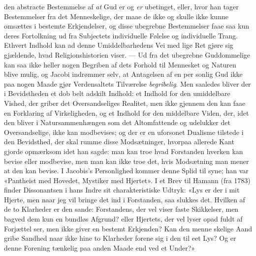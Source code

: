 \documentclass[12pt,a4paper]{book}
\begin{document}
den abstracte Bestemmelse af \emph{at} Gud er og \emph{er} ubetinget, eller,
hvor han tager Bestemmelser fra det Menneskelige, der maae
de ikke og skulle ikke kunne omsættes i bestemte Erkjendelser,
og disse ubegrebne Bestemmelser faae saa kun deres Fortolkning
ud fra Subjectets individuelle Følelse og individuelle Trang.
Ethvert Indhold kan ad denne Umiddelbarhedens Vei med lige
Ret gjøre sig gjældende, hvad Religionshistorien viser. --- Ud
fra det ubegrebne Guddommelige kan saa ikke heller nogen
Begriben af dets Forhold til Mennesket og Naturen blive
mulig, og Jacobi indrømmer selv, at Antagelsen af en per\-%
sonlig Gud ikke paa nogen Maade gjør Verdensaltets Tilværelse
\emph{begribelig}. Men saaledes bliver der i Bevidstheden et dob\-%
belt adskilt Indhold: et Indhold for den umiddelbare Vished,
der griber det Oversandseliges Realitet, men ikke gjennem den
kan faae en Forklaring af Virkeligheden, og et Indhold for den
middelbare Viden, der, idet den bliver i Natursammenhængen
som det Altomfattende og udelukker det Oversandselige, ikke
kan modbevises; og der er en uforsonet Dualisme tilstede i
den Bevidsthed, der skal rumme disse Modsætninger, hvorpaa
allerede Kant gjorde opmærksom idet han sagde: man kan
troe hvad Forstanden hverken kan bevise eller modbevise, men
man kan ikke troe det, hvis Modsætning man mener at den
kan bevise. I Jacobis's Personlighed kommer denne Splid til\-%
syne; han var «Pantheist med Hovedet, Mystiker med Hjertet».
I et Brev til Hamann (fra 1783) finder Dissonantsen i hans
Indre sit charakteristiske Udtryk: «Lys er der i mit Hjerte,
men naar jeg vil bringe det ind i Forstanden, saa slukkes det.
Hvilken af de to Klarheder er den sande: Forstandens, der
vel viser faste Skikkelser, men bagved dem kun en bundløs
Afgrund? eller Hjertets, der vel lyser opad fuldt af Forjættel\-%
ser, men ikke giver en bestemt Erkjenden? Kan den menne\-%
skelige Aand gribe Sandhed naar ikke hine to Klarheder forene
sig i den til eet Lys? Og er denne Forening tænkelig paa
anden Maade end ved et Under?»
\end{document}

